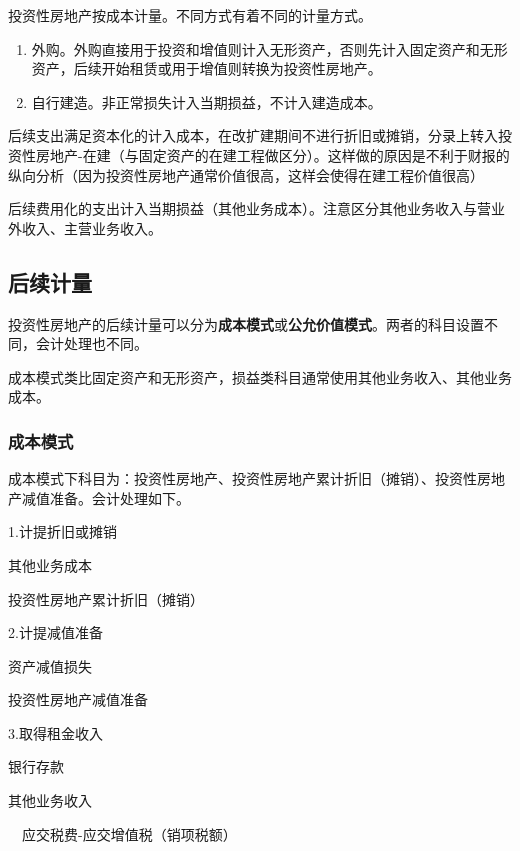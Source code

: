 \documentclass[UTF8,12pt]{ctexart}
\newenvironment{Dr}{%
	\begin{list}{}%
		{
			\setlength{\leftmargin}{2em}
			\setlength{\labelwidth}{2em}
			\setlength{\labelsep}{0pt}
			\setlength{\itemindent}{0pt}
			\setlength{\listparindent}{0pt}
			\setlength{\parsep}{0pt}
			\setlength{\topsep}{0pt}
		}
		\item[\textbf{借：}]
	}{%
	\end{list}
}
\newenvironment{Cr}{%
	\begin{list}{}%
		{
			\setlength{\leftmargin}{2em}
			\setlength{\labelwidth}{2em}
			\setlength{\labelsep}{0pt}
			\setlength{\itemindent}{0pt}
			\setlength{\listparindent}{0pt}
			\setlength{\parsep}{0pt}
			\setlength{\topsep}{0pt}
		}
		\item[\textbf{贷：}]
	}{%
	\end{list}
}
\numberwithin{equation}{section} %
\numberwithin{figure}{section}
\numberwithin{table}{section}
\begin{document}
	
	投资性房地产按成本计量。不同方式有着不同的计量方式。
	
	\begin{enumerate}
		\item 外购。外购直接用于投资和增值则计入无形资产，否则先计入固定资产和无形资产，后续开始租赁或用于增值则转换为投资性房地产。
		
		\item 自行建造。非正常损失计入当期损益，不计入建造成本。
	\end{enumerate}
	
	后续支出满足资本化的计入成本，在改扩建期间不进行折旧或摊销，分录上转入投资性房地产-在建（与固定资产的在建工程做区分）。这样做的原因是不利于财报的纵向分析（因为投资性房地产通常价值很高，这样会使得在建工程价值很高）
	
	后续费用化的支出计入当期损益（其他业务成本）。注意区分其他业务收入与营业外收入、主营业务收入。
	
	\subsection{后续计量}
	投资性房地产的后续计量可以分为\textbf{成本模式}或\textbf{公允价值模式}。两者的科目设置不同，会计处理也不同。
	
	成本模式类比固定资产和无形资产，损益类科目通常使用其他业务收入、其他业务成本。
	
	\subsubsection{成本模式}
	成本模式下科目为：投资性房地产、投资性房地产累计折旧（摊销）、投资性房地产减值准备。会计处理如下。
	
	1.计提折旧或摊销
	
	\begin{Dr}
		其他业务成本
	\end{Dr}
	\begin{Cr}
		投资性房地产累计折旧（摊销）
	\end{Cr}
	
	2.计提减值准备
	
	\begin{Dr}
		资产减值损失
	\end{Dr}
	\begin{Cr}
		投资性房地产减值准备
	\end{Cr}

	
	3.取得租金收入
	
	\begin{Dr}
		银行存款
	\end{Dr}
	\begin{Cr}
		其他业务收入
		
		\ \ 应交税费-应交增值税（销项税额）
	\end{Cr}
	
\end{document}
